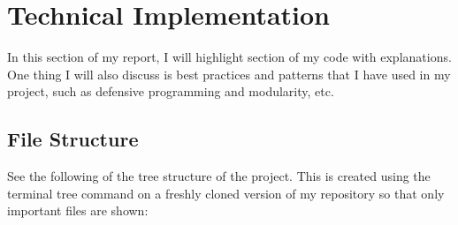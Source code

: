 \chapter{Technical Implementation}
In this section of my report, I will highlight section of my code with explanations. One thing I will also discuss is best practices and patterns that I have used in my project, such as defensive programming and modularity, etc.

\section{File Structure}
See the following of the tree structure of the project. This is created using the terminal tree command on a freshly cloned version of my repository so that only important files are shown:




